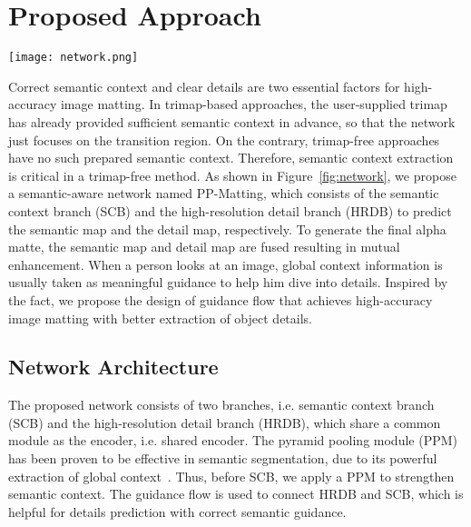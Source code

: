 \documentclass[10pt,twocolumn,letterpaper]{article}
\begin{document}
\section{Proposed Approach}

\begin{figure*}[t!]
\centerline{\texttt{[image: network.png]}}
\caption{The overview of network architecture. HRNet is used as the encoder, the low-resolution output is used as the input of PPM, and the high-resolution output is used as the input of the high-resolution detail branch (HRDB). The semantic context branch (SCB) has five blocks, and the first, third, and fifth blocks guide the HRDB to learn semantic context. The HRDB maintains high-resolution inference to have a high-quality detail prediction.}
\label{fig:network}
\end{figure*}

Correct semantic context and clear details are two essential factors for high-accuracy image matting. In trimap-based approaches, the user-supplied trimap has already provided sufficient semantic context in advance, so that the network just focuses on the transition region. On the contrary, trimap-free approaches have no such prepared semantic context. Therefore, semantic context extraction is critical in a trimap-free method. As shown in Figure~\ref{fig:network}, we propose a semantic-aware network named PP-Matting, which consists of the semantic context branch (SCB) and the high-resolution detail branch (HRDB) to predict the semantic map and the detail map, respectively. To generate the final alpha matte, the semantic map and detail map are fused resulting in mutual enhancement. When a person looks at an image,  global context information is usually taken as meaningful guidance to help him dive into details. Inspired by the fact, we propose the design of guidance flow that achieves high-accuracy image matting with better extraction of object details.

\subsection{Network Architecture}
The proposed network consists of two branches, i.e. semantic context branch (SCB) and the high-resolution detail branch (HRDB), which share a common module as the encoder, i.e. shared encoder. The pyramid pooling module (PPM) has been proven to be effective in semantic segmentation, due to its powerful extraction of global context~\cite{zhao2017pyramid}. Thus, before SCB, we apply a PPM to strengthen semantic context. The guidance flow is used to connect HRDB and SCB, which is helpful for details prediction with correct semantic guidance. 
\end{document}
